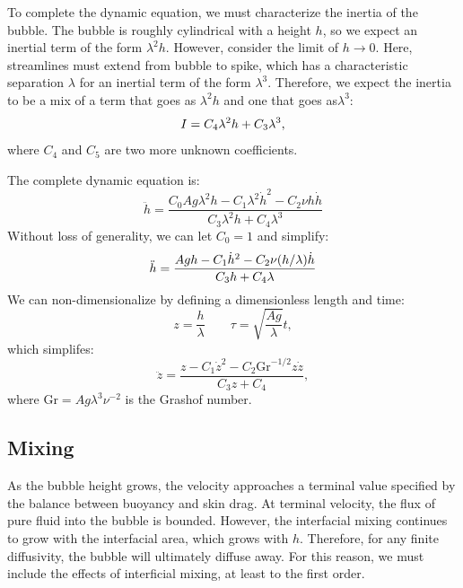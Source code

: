 To complete the dynamic equation, we must characterize the inertia of the bubble.
The bubble is roughly cylindrical with a height $h$, so we expect an inertial term of the form $\lambda^2 h$.
However, consider the limit of $h \rightarrow 0$.  
Here, streamlines must extend from bubble to spike, which has a characteristic separation $\lambda$ for an inertial term of the form $\lambda^3$.
Therefore, we expect the inertia to be a mix of a term that goes as $\lambda^2 h$ and one that goes as$\lambda^3$:
\begin{equation} \elabel{inertia}
I = C_4 \lambda^2 h + C_3 \lambda^3,
\end{equation}
where $C_4$ and $C_5$ are two more unknown coefficients.

The complete dynamic equation is:
\begin{equation}
\ddot{h} = \frac{C_0 A g \lambda^2 h - C_1 \lambda^2 \dot{h}^2 - C_2 \nu h \dot{h}}{C_3 \lambda^2 h + C_4 \lambda^3}
\end{equation}
Without loss of generality, we can let $C_0 = 1$ and simplify:
\begin{equation} \elabel{dynamics}
\ddot{h} = \frac{A g h - C_1 \dot{h}^2 - C_2 \nu (h/\lambda) \dot{h}}{ C_3 h + C_4 \lambda }
\end{equation}
We can non-dimensionalize by defining a dimensionless length and time:
\begin{equation}
z = \frac{h}{\lambda} \qquad \tau = \sqrt{\frac{A g}{\lambda}} t,
\end{equation}
which simplifes:
\begin{equation}
\ddot{z} = \frac{z - C_1 \dot{z}^2 - C_2 \text{Gr}^{-1/2} z \dot{z}}{C_3 z + C_4},
\end{equation}
where $\text{Gr} = A g \lambda^3 \nu^{-2}$ is the Grashof number.


\subsection{Mixing}

As the bubble height grows, the velocity approaches a terminal value specified by the balance between buoyancy and skin drag.
At terminal velocity, the flux of pure fluid into the bubble is bounded.
However, the interfacial mixing continues to grow with the interfacial area, which grows with $h$.
Therefore, for any finite diffusivity, the bubble will ultimately diffuse away.
For this reason, we must include the effects of interficial mixing, at least to the first order.

